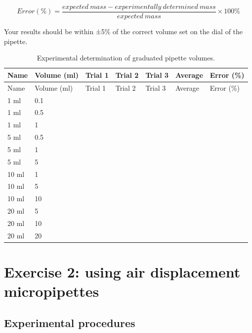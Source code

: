 \documentclass[]{book}
\theoremstyle{definition}
\theoremstyle{definition}
\theoremstyle{definition}
\theoremstyle{remark}
\begin{document}
\[ Error (\%) = \frac{expected\ mass - experimentally\ determined\ mass}{expected\ mass} \times 100\% \]

Your results should be within ±5\% of the correct volume set on the dial
of the pipette.

\begin{longtable}[]{@{}lllllll@{}}
\caption{\label{tab:graduated} Experimental determination of graduated
pipette volumes.}\tabularnewline
\toprule
Name & Volume (ml) & Trial 1 & Trial 2 & Trial 3 & Average & Error
(\%)\tabularnewline
\midrule
\endfirsthead
\toprule
Name & Volume (ml) & Trial 1 & Trial 2 & Trial 3 & Average & Error
(\%)\tabularnewline
\midrule
\endhead
1 ml & 0.1 & & & & &\tabularnewline
1 ml & 0.5 & & & & &\tabularnewline
1 ml & 1 & & & & &\tabularnewline
5 ml & 0.5 & & & & &\tabularnewline
5 ml & 1 & & & & &\tabularnewline
5 ml & 5 & & & & &\tabularnewline
10 ml & 1 & & & & &\tabularnewline
10 ml & 5 & & & & &\tabularnewline
10 ml & 10 & & & & &\tabularnewline
20 ml & 5 & & & & &\tabularnewline
20 ml & 10 & & & & &\tabularnewline
20 ml & 20 & & & & &\tabularnewline
\bottomrule
\end{longtable}

\section{Exercise 2: using air displacement
micropipettes}\label{exercise-2-using-air-displacement-micropipettes}

\subsection{Experimental procedures}\label{experimental-procedures-5}
\end{document}
